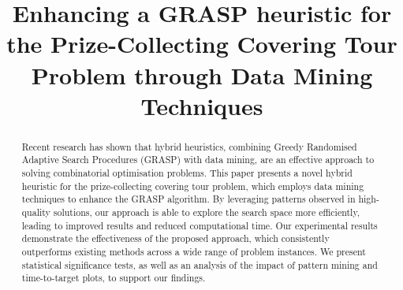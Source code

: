 \documentclass{singlecol-new}
\begin{document}

%





\BottomCatch

\CLline


\def\floatpagepagefraction{1}
\def\textpagefraction{.001}


\title{Enhancing a GRASP heuristic for the Prize-Collecting Covering Tour Problem through Data Mining Techniques}









\begin{abstract}

Recent research has shown that hybrid heuristics, combining Greedy Randomised Adaptive Search Procedures (GRASP) with data mining, are an effective approach to solving combinatorial optimisation problems. This paper presents a novel hybrid heuristic for the prize-collecting covering tour problem, which employs data mining techniques to enhance the GRASP algorithm. By leveraging patterns observed in high-quality solutions, our approach is able to explore the search space more efficiently, leading to improved results and reduced computational time. Our experimental results demonstrate the effectiveness of the proposed approach, which consistently outperforms existing methods across a wide range of problem instances. We present statistical significance tests, as well as an analysis of the impact of pattern mining and time-to-target plots, to support our findings.

\end{abstract}
\end{document}
